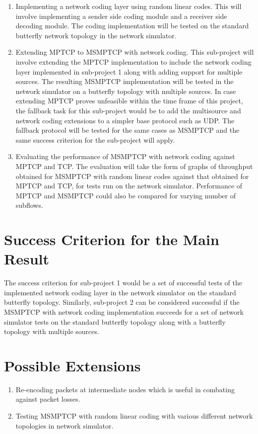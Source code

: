 \documentclass[12pt,a4paper,twoside]{article}
\begin{document}
\begin{enumerate}
  \item Implementing a network coding layer using random linear codes. This will involve implementing a sender side coding module and a receiver side decoding module. The coding implementation will be tested on the standard butterfly network topology in the network simulator. 
  \item Extending MPTCP to MSMPTCP with network coding. This sub-project will involve extending the MPTCP implementation to include the network coding layer implemented in sub-project 1 along with adding support for multiple sources. The resulting MSMPTCP implementation will be tested in the network simulator on a butterfly topology with multiple sources. In case extending MPTCP proves unfeasible within the time frame of this project, the fallback task for this sub-project would be to add the multisource and network coding extensions to a simpler base protocol such as UDP. The fallback protocol will be tested for the same cases as MSMPTCP and the same success criterion for the sub-project will apply.
  \item Evaluating the performance of MSMPTCP with network coding against MPTCP and TCP. The evaluation will take the form of graphs of throughput obtained for MSMPTCP with random linear codes against that obtained for MPTCP and TCP, for tests run on the network simulator. Performance of MPTCP and MSMPTCP could also be compared for varying number of subflows. 
\end{enumerate}

\section*{Success Criterion for the Main Result}

The success criterion for sub-project 1 would be a set of successful tests of the implemented network coding layer in the network simulator on the standard butterfly topology. Similarly, sub-project 2 can be considered successful if the MSMPTCP with network coding implementation succeeds for a set of network simulator tests on the standard butterfly topology along with a butterfly topology with multiple sources. 

\section*{Possible Extensions}

\begin{enumerate}
  \item Re-encoding packets at intermediate nodes which is useful in combating against packet losses.
  \item Testing MSMPTCP with random linear coding with various different network topologies in network simulator.
\end{enumerate}
\end{document}
